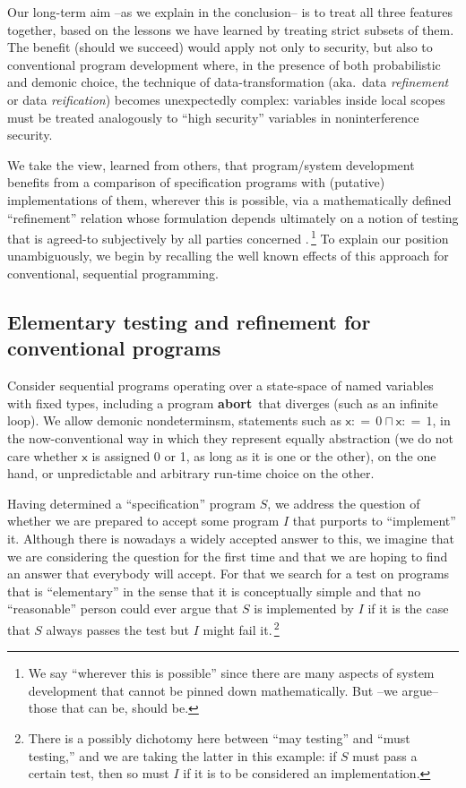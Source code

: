 \documentclass[runningheads]{llncs}
\newcommand\Vx {\mathsf{x}}
\newcommand\Gets {{:}{=}\,}
\newcommand\Or {\mathbin{\sqcap}}
\newcommand\Abort {\textbf{abort}}
\begin{document}
Our long-term aim --as we explain in the conclusion-- is to treat all three features together, based on the lessons we have learned by treating strict subsets of them. The benefit (should we succeed) would apply not only to security, but also to conventional program development where, in the presence of both probabilistic and demonic choice, the technique of data-transformation (aka.\ data \emph{refinement} or data \emph{reification}) becomes unexpectedly complex: variables inside local scopes must be treated analogously to ``high security'' variables in noninterference security.

We take the view, learned from others, that program/system development benefits from a comparison of specification programs with (putative) implementations of them, wherever this is possible, via a mathematically defined ``refinement'' relation whose formulation depends ultimately on a notion of testing that is agreed-to subjectively by all parties concerned \cite{Nicola:84}.\,\footnote{We say ``wherever this is possible'' since there are many aspects of system development that cannot be pinned down mathematically. But --we argue-- those that can be, should be.}
To explain our position unambiguously, we begin by recalling the well known effects of this approach for conventional, sequential programming.

\subsection{Elementary testing and refinement for conventional programs}\label{s1309}
Consider sequential programs operating over a state-space of named variables with fixed types, including a program \Abort\ that diverges (such as an infinite loop). We allow demonic nondeterminsm, statements such as $\Vx\Gets0\Or\Vx\Gets1$, in the now-conventional way in which they represent equally abstraction (we do not care whether $\Vx$ is assigned 0 or 1, as long as it is one or the other), on the one hand, or unpredictable and arbitrary run-time choice on the other.

Having determined a ``specification'' program $S$, we address the question of whether we are prepared to accept some program $I$ that purports to ``implement'' it. Although there is nowadays a widely accepted answer to this, we imagine that we are considering the question for the first time and that we are hoping to find an answer that everybody will accept. For that we search for a test on programs that is ``elementary'' in the sense that it is conceptually simple and that no ``reasonable'' person could ever argue that $S$ is implemented by $I$ if it is the case that $S$ always passes the test but $I$ might fail it.\,\footnote{There is a possibly dichotomy here between ``may testing'' and ``must testing,'' and we are taking the latter in this example: if $S$ must pass a certain test, then so must $I$ if it is to be considered an implementation.}
\end{document}

